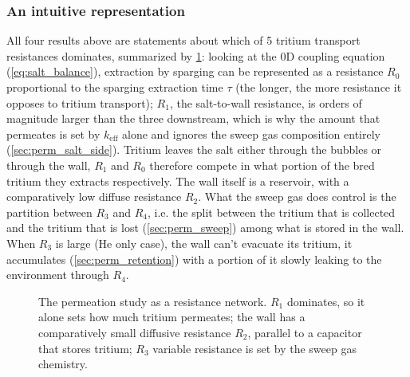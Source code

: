 \documentclass[a4paper,11pt,oneside]{report}
\begin{document}
\subsubsection{An intuitive representation}
All four results above are statements about which of 5 tritium transport resistances dominates, summarized by \cref{fig:resistances}: looking at the 0D coupling equation (\cref{eq:salt_balance}), extraction by sparging can be represented as a resistance $R_0$ proportional to the sparging extraction time $\tau$ (the longer, the more resistance it opposes to tritium transport); $R_1$, the salt-to-wall resistance, is orders of magnitude larger than the three downstream, which is why the amount that permeates is set by $k_\mathrm{eff}$ alone and ignores the sweep gas composition entirely (\cref{sec:perm_salt_side}).  Tritium leaves the salt either through the bubbles or through the wall, $R_1$ and $R_0$ therefore compete in what portion of the bred tritium they extracts respectively. The wall itself is a reservoir, with a comparatively low diffuse resistance $R_2$. What the sweep gas does control is the partition between $R_3$ and $R_4$, i.e. the split between the tritium that is collected and the tritium that is lost (\cref{sec:perm_sweep}) among what is stored in the wall. When $R_3$ is large (He only case), the wall can't evacuate its tritium, it accumulates (\cref{sec:perm_retention}) with a portion of it slowly leaking to the environment through $R_4$.

\begin{figure}[htbp]
  \centering
  \resizebox{\linewidth}{!}{}
  \caption{The permeation study as a resistance network. $R_1$ dominates, so it alone sets how much tritium permeates; the wall has a comparatively small diffusive resistance $R_2$, parallel to a capacitor that stores tritium; $R_3$ variable resistance is set by the sweep gas chemistry.}
  \label{fig:resistances}
\end{figure}


\end{document}
